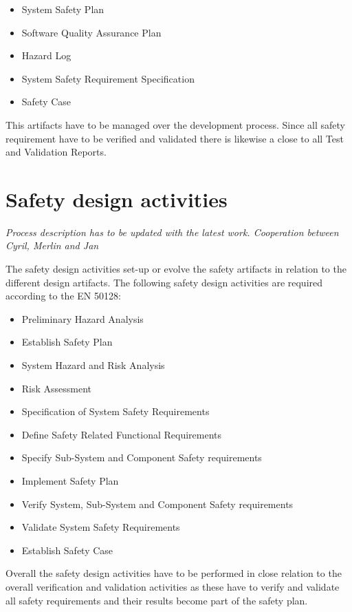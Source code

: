\documentclass{template/openetcs_report}
\begin{document}
\begin{itemize}
\item System Safety Plan
\item Software Quality Assurance Plan
\item Hazard Log
\item System Safety Requirement Specification
\item Safety Case
\end{itemize} 

This artifacts have to be managed over the development process. Since all safety requirement have to be verified and validated there is likewise a close to all Test and Validation Reports.

\section{Safety design activities}
\label{safetyactivities}

\textit{Process description has to be updated with the latest work. Cooperation between Cyril, Merlin and Jan}


The safety design activities set-up or evolve the safety artifacts in relation to the different design artifacts. The following safety design activities are required according to the EN 50128:

\begin{itemize}
\item Preliminary Hazard Analysis
\item Establish Safety Plan
\item System Hazard and Risk Analysis
\item Risk Assessment
\item Specification of System Safety Requirements
\item Define Safety Related Functional Requirements
\item Specify Sub-System and Component Safety requirements
\item Implement Safety Plan
\item Verify System, Sub-System and Component Safety requirements
\item Validate System Safety Requirements
\item Establish Safety Case
\end{itemize}

Overall the safety design activities have to be performed in close relation to the overall verification and validation activities as these have to verify and validate all safety requirements and their results become part of the safety plan.
\end{document}
